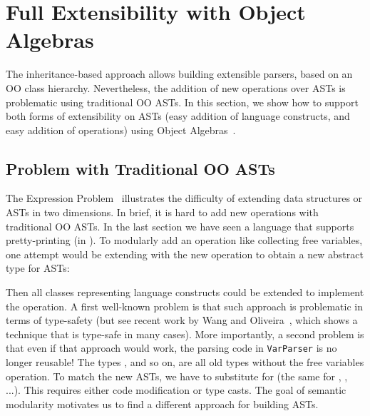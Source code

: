 \section{Full Extensibility with Object Algebras}\label{sec:algebrasandparsing}

The inheritance-based approach allows building extensible parsers, based on an OO class hierarchy.  Nevertheless, the addition of new operations over ASTs is problematic using traditional OO ASTs. In this section, we
show how to support both forms of extensibility on ASTs (easy
addition of language constructs, and easy addition of operations)
using Object Algebras~\cite{Oliveira:2012}.

\subsection{Problem with Traditional OO ASTs}\label{subsec:problemwithoutoa}

The Expression Problem~\cite{wadler1998expression} illustrates the
difficulty of extending data structures or ASTs in two dimensions.
In brief, it is hard to add new operations with traditional OO ASTs.
In the last section we have seen a language
that supports pretty-printing (in ).
To modularly add an operation like collecting free variables, one attempt
would be extending
 with the new operation to obtain a new abstract type
for ASTs:

\vspace{-4pt}
\vspace{-4pt}

\noindent Then all classes representing language constructs could be
extended to implement the operation. A first well-known problem is that such
approach is problematic in terms of type-safety (but see recent work
by Wang and Oliveira~\cite{wang2016expression}, which shows a technique that is type-safe
in many cases). More importantly, a second problem is that
even if that approach would work, the parsing code in \lstinline{VarParser} is no longer reusable!
The types , and so on, are all old types without the free variables operation.
To match the new ASTs, we have to substitute  for  (the
same for , , ...). This requires either code modification or type casts.
The goal of semantic modularity motivates us to find a different approach for building ASTs.

